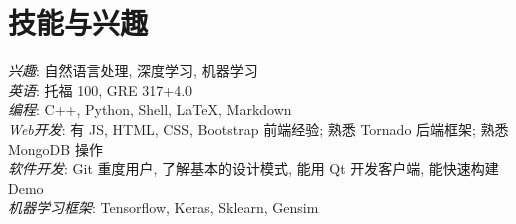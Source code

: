 \section{技能与兴趣}
\textit{兴趣}: 自然语言处理, 深度学习, 机器学习\\
\textit{英语}: 托福 100, GRE 317+4.0\\
\textit{编程}: C++, Python, Shell, LaTeX, Markdown\\
\textit{Web开发}: 有 JS, HTML, CSS, Bootstrap 前端经验; 熟悉 Tornado 后端框架; 熟悉 MongoDB 操作\\
\textit{软件开发}: Git 重度用户, 了解基本的设计模式, 能用 Qt 开发客户端, 能快速构建 Demo\\
\textit{机器学习框架}: Tensorflow, Keras, Sklearn, Gensim